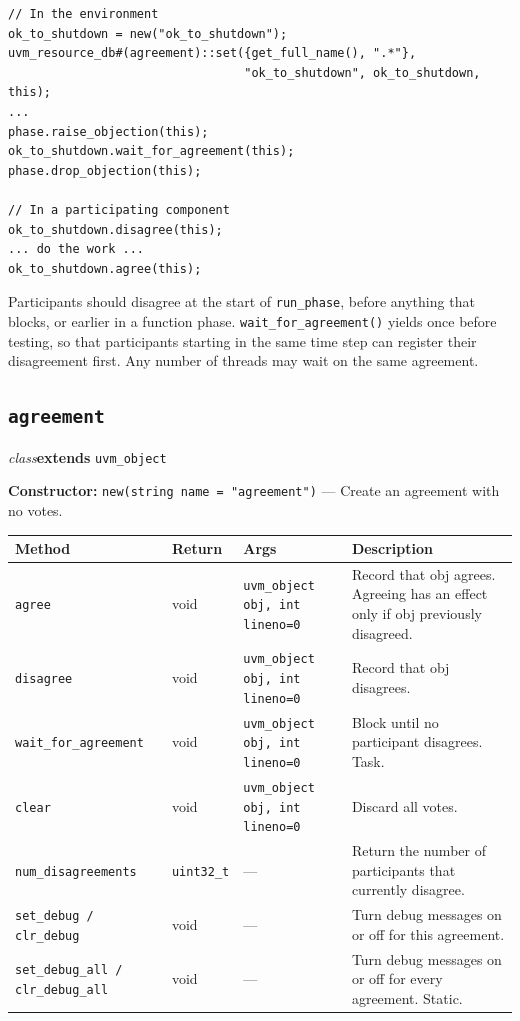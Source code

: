 \documentclass[11pt,letterpaper]{report}
\begin{document}
\begin{verbatim}
// In the environment
ok_to_shutdown = new("ok_to_shutdown");
uvm_resource_db#(agreement)::set({get_full_name(), ".*"},
                                 "ok_to_shutdown", ok_to_shutdown, this);
...
phase.raise_objection(this);
ok_to_shutdown.wait_for_agreement(this);
phase.drop_objection(this);

// In a participating component
ok_to_shutdown.disagree(this);
... do the work ...
ok_to_shutdown.agree(this);
\end{verbatim}

Participants should disagree at the start of \texttt{run\_phase}, before anything that blocks, or earlier in a function phase. \texttt{wait\_for\_agreement()} yields once before testing, so that participants starting in the same time step can register their disagreement first. Any number of threads may wait on the same agreement.

\subsection*{\texttt{agreement}}
\noindent\small\textit{class}\quad \textbf{extends} \texttt{uvm\_object}\par

\noindent\textbf{Constructor:} \texttt{new(string name = "agreement")} --- Create an agreement with no votes.

\begin{xltabular}{\linewidth}{>{\small}p{1.35in} >{\small}p{1.25in} >{\small}p{0.95in} >{\small}X}
\toprule
\textbf{Method} & \textbf{Return} & \textbf{Args} & \textbf{Description} \\
\midrule
\endhead
\bottomrule
\endfoot
\texttt{agree} & void & \texttt{uvm\_object obj, int lineno=0} & Record that obj agrees. Agreeing has an effect only if obj previously disagreed. \\
\texttt{disagree} & void & \texttt{uvm\_object obj, int lineno=0} & Record that obj disagrees. \\
\texttt{wait\_for\_agreement} & void & \texttt{uvm\_object obj, int lineno=0} & Block until no participant disagrees. Task. \\
\texttt{clear} & void & \texttt{uvm\_object obj, int lineno=0} & Discard all votes. \\
\texttt{num\_disagreements} & \texttt{uint32\_t} & --- & Return the number of participants that currently disagree. \\
\texttt{set\_debug / clr\_debug} & void & --- & Turn debug messages on or off for this agreement. \\
\texttt{set\_debug\_all / clr\_debug\_all} & void & --- & Turn debug messages on or off for every agreement. Static. \\
\end{xltabular}
\end{document}
